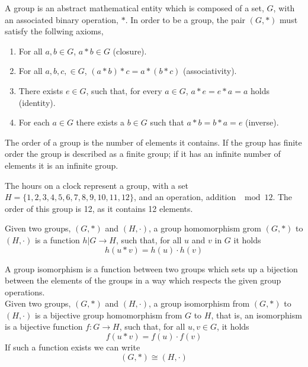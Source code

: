 \begin{definition}[Group]
  A group is an abstract mathematical entity which is composed of a
  set, $G$, with an associated binary operation, $*$. In order to be a
  group, the pair $(G, *)$ must satisfy the follwing axioms,
  \begin{enumerate}
  \item For all $a,b \in G$, $a*b \in G$
    (closure). \label{itm:groupclosure} \item For all $a,b,c, \in G$, $(a*b)*c = a*(b*c)$ (associativity). \label{itm:groupassoc}
\item There exists $e \in G$, such that, for every $a \in G$, $a*e = e*a = a$ holds (identity). \label{itm:groupidentity}
  \item For each $a \in G$ there exists a $b \in G$ such that $a*b = b*a = e$ (inverse). \label{itm:groupinverse}
  \end{enumerate}
\end{definition}
\begin{definition}
  The order of a group is the number of elements it contains. If the
  group has finite order the group is described as a finite group; if
  it has an infinite number of elements it is an infinite group.
\end{definition}
\begin{example}
  The hours on a clock represent a group, with a set $H =
  \{1,2,3,4,5,6,7,8,9,10,11,12\}$, and an operation, addition $\mod
  12$. The order of this group is 12, as it contains 12 elements.
\end{example}
\begin{definition}[Homomorphism]
  Given two groups, $(G,*)$ and $(H, \cdot)$, a group homomorphism
  grom $(G,*)$ to $(H, \cdot)$ is a function $h|G \to H$, such that,
  for all $u$ and $v$ in $G$ it holds
  \[ h(u * v) = h(u)\cdot h(v) \]
\end{definition}
\begin{definition}[Isomophism]
  A group isomorphism is a function between two groups which sets up a
  bijection between the elements of the groups in a way which respects
  the given group operations.\\
  Given two groups, $(G,*)$ and $(H, \cdot)$, a group isomorphism from
  $(G,*)$ to $(H,\cdot)$ is a bijective group homomorphism from $G$ to
  $H$, that is, an isomorphism is a bijective function $f : G \to H$,
  such that, for all $u,v \in G$, it holds \[ f(u*v) = f(u) \cdot
  f(v) \] If such a function exists we can write
  \[(G,*) \cong (H,\cdot) \]
\end{definition}
